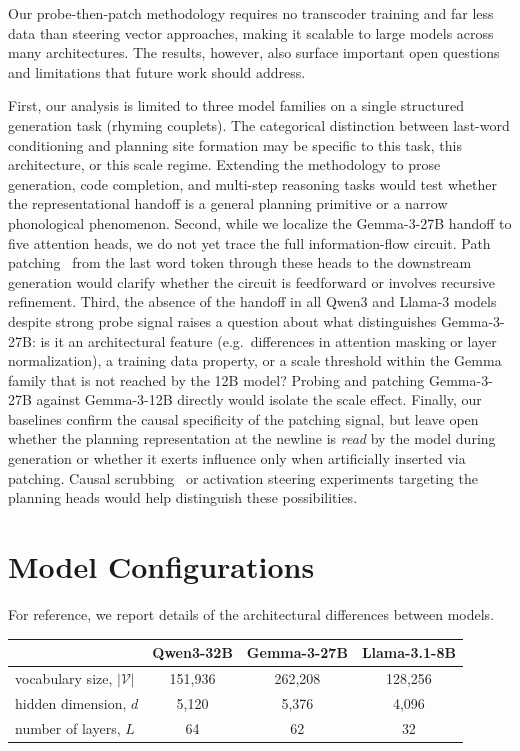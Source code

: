 \documentclass{article}
\begin{document}
Our probe-then-patch methodology requires no transcoder training and far less data than steering vector approaches, making it scalable to large models across many architectures. The results, however, also surface important open questions and limitations that future work should address.

First, our analysis is limited to three model families on a single structured generation task (rhyming couplets). The categorical distinction between last-word conditioning and planning site formation may be specific to this task, this architecture, or this scale regime. Extending the methodology to prose generation, code completion, and multi-step reasoning tasks would test whether the representational handoff is a general planning primitive or a narrow phonological phenomenon. Second, while we localize the Gemma-3-27B handoff to five attention heads, we do not yet trace the full information-flow circuit. Path patching~\citep{goldowsky2023localizing} from the last word token through these heads to the downstream generation would clarify whether the circuit is feedforward or involves recursive refinement. Third, the absence of the handoff in all Qwen3 and Llama-3 models despite strong probe signal raises a question about what distinguishes Gemma-3-27B: is it an architectural feature (e.g.\ differences in attention masking or layer normalization), a training data property, or a scale threshold within the Gemma family that is not reached by the 12B model? Probing and patching Gemma-3-27B against Gemma-3-12B directly would isolate the scale effect. Finally, our baselines confirm the causal specificity of the patching signal, but leave open whether the planning representation at the newline is \textit{read} by the model during generation or whether it exerts influence only when artificially inserted via patching. Causal scrubbing~\citep{chan2022causal} or activation steering experiments targeting the planning heads would help distinguish these possibilities.





\appendix

\section{Model Configurations}
\label{sec:model-config}
For reference, we report details of the architectural differences between models. 

\begin{table}[h]
\centering
\begin{tabular}{lccc}
\toprule
 & Qwen3-32B & Gemma-3-27B  & Llama-3.1-8B \\
\midrule
vocabulary size, $|\mathcal V|$ & 151,936 & 262,208 & 128,256 \\
hidden dimension, $d$           & 5,120   & 5,376   & 4,096  \\
number of layers, $L$           & 64      & 62      & 32     \\
\bottomrule
\end{tabular}
\label{tab:models}
\end{table}
\end{document}
